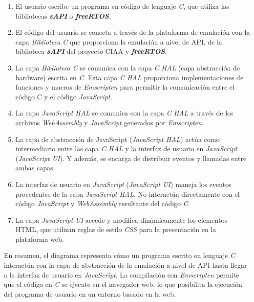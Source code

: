 \begin{enumerate}
	\item El usuario escribe un programa en código de lenguaje \textit{C}, que utiliza las bibliotecas \textit{\textbf{sAPI}} o \textit{\textbf{freeRTOS}}. 
	
	\item El código del usuario se conecta a través de la plataforma de emulación con la capa 
\textit{Biblioteca C} que proporciona la emulación a nivel de API, de la biblioteca \textit{\textbf{sAPI}} del proyecto CIAA y \textit{\textbf{freeRTOS}}.
	
	\item La capa \textit{Biblioteca C} se comunica con la capa \textit{C HAL} (capa abstracción de hardware) escrita en \textit{C}. Esta capa \textit{C HAL} proporciona implementaciones de funciones y macros de \textit{Emscripten} para permitir la comunicación entre el código {C} y el código \textit{JavaScript}.
	
	\item La capa \textit{JavaScript HAL} se comunica con la capa \textit{C HAL}  a través de los archivos \textit{WebAssembly} y \textit{JavaScript} generados por \textit{Emscripten}.
	
	\item La capa de abstracción de JavaScript (\textit{JavaScript HAL}) actúa como intermediario entre las capa \textit{C HAL} y la interfaz de usuario en \textit{JavaScript} (\textit{JavaScript UI}). Y además, se encarga de distribuir eventos y llamadas entre ambas capas.
	
\item La interfaz de usuario en \textit{JavaScript} (\textit{JavaScript UI}) maneja los eventos procedentes de la capa \textit{JavaScript HAL}. No interactúa directamente con el código \textit{JavaScript} y \textit{WebAssembly} resultante del código \textit{C}.

\item La capa \textit{JavaScript UI} accede y modifica dinámicamente los elementos HTML, que utilizan reglas de estilo \textit{CSS} para la presentación en la plataforma web.
	
\end{enumerate}


En resumen, el diagrama representa cómo un programa escrito en lenguaje \textit{C} interactúa con la capa de abstracción de la emulación a nivel de API hasta llegar a la interfaz de usuario en \textit{JavaScript}. La compilación con \textit{Emscripten} permite que el código en \textit{C} se ejecute en el navegador web, lo que posibilita la ejecución del programa de usuario en un entorno basado en la web.


